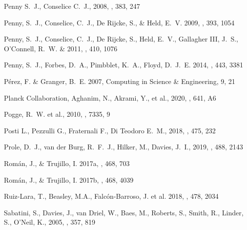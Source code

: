 \documentclass[twocolumn,tighten]{aastex63}
\begin{document}
\begin{thebibliography}{}
Penny S.~J., Conselice C.~J., 2008, \mnras, 383, 247

Penny, S.~J., Conselice, C.~J., De Rijcke, S., \& Held, E.~V. 2009, \mnras, 393, 1054

Penny, S.~J., Conselice, C.~J., De Rijcke, S., Held, E.~V., Gallagher III, J.~S., O'Connell, R.~W. \& 2011, \mnras, 410, 1076

Penny, S.~J., Forbes, D.~A., Pimbblet, K.~A., Floyd, D.~J.~E. 2014, \mnras, 443, 3381


P\'{e}rez, F. \& Granger, B.~E. 2007, Computing in Science \& Engineering, 9, 21

{Planck Collaboration}, Aghanim, N., Akrami, Y., et al., 2020, \aap, 641, A6

Pogge, R.~W. et al., 2010, \procspie, 7335, 9

Posti L., Pezzulli G., Fraternali F., Di Teodoro E.~M., 2018, \mnras, 475, 232

Prole, D.~J., van der Burg, R.~F.~J., Hilker, M., Davies, J.~I., 2019, \mnras, 488, 2143


Rom\'{a}n, J., \& Trujillo, I. 2017a, \mnras, 468, 703

Rom\'{a}n, J., \& Trujillo, I. 2017b, \mnras, 468, 4039
    

Ruiz-Lara, T., Beasley, M.A., Falc\'on-Barroso, J. et al. 2018, \mnras, 478, 2034

Sabatini, S., Davies, J., van Driel, W., Baes, M., Roberts, S., Smith, R., Linder, S., O'Neil, K., 2005, \mnras, 357, 819


\end{thebibliography}
\end{document}
